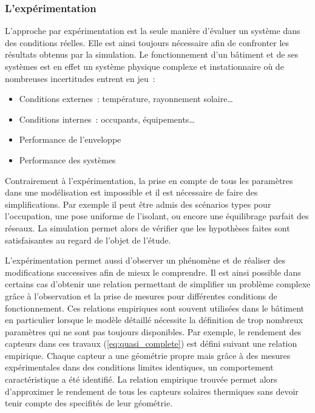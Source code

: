 \subsubsection{L’expérimentation} %
\label{ssub:l_experimentation}
L’approche par expérimentation est la seule manière d’évaluer un système dans des
conditions réelles. Elle est ainsi toujours nécessaire afin de confronter les résultats
obtenus par la simulation.
Le fonctionnement d’un bâtiment et de ses systèmes est en effet un système physique
complexe et instationnaire où de nombreuses incertitudes entrent en jeu~:
\begin{itemize}
    \item Conditions externes~: température, rayonnement solaire\dots
    \item Conditions internes~: occupants, équipements\dots
    \item Performance de l’enveloppe
    \item Performance des systèmes
\end{itemize}
Contrairement à l’expérimentation, la prise en compte de tous les paramètres dans une
modélisation est impossible et il est nécessaire de faire des simplifications. Par exemple
il peut être admis des scénarios types pour l’occupation, une pose uniforme de l’isolant,
ou encore une équilibrage parfait des réseaux. La simulation permet alors de vérifier que
les hypothèses faites sont satisfaisantes au regard de l’objet de l’étude.

L’expérimentation permet aussi d’observer un phénomène et de réaliser des modifications
successives afin de mieux le comprendre. Il est ainsi possible dans certains cas d’obtenir
une relation permettant de simplifier un problème complexe grâce à l’observation et la
prise de mesures pour différentes conditions de fonctionnement. Ces relations empiriques
sont souvent utilisées dans le bâtiment en particulier lorsque le modèle détaillé
nécessite la définition de trop nombreux paramètres qui ne sont pas toujours disponibles.
Par exemple, le rendement des capteurs dans ces travaux (\ref{eq:quasi_complete}) est
défini suivant une relation empirique. Chaque capteur a une géométrie propre mais grâce à
des mesures expérimentales dans des conditions limites identiques, un comportement
caractéristique a été identifié. La relation empirique trouvée permet alors d’approximer le
rendement de tous les capteurs solaires thermiques sans devoir tenir compte des specifités
de leur géométrie.


